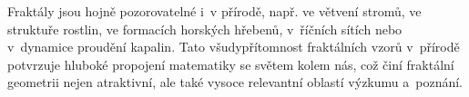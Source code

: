 Fraktály jsou hojně pozorovatelné i~v přírodě, např. ve větvení stromů, ve struktuře rostlin, ve formacích horských hřebenů, v~říčních sítích nebo v~dynamice proudění kapalin. Tato všudypřítomnost fraktálních vzorů v~přírodě potvrzuje hluboké propojení matematiky se světem kolem nás, což činí fraktální geometrii nejen atraktivní, ale také vysoce relevantní oblastí výzkumu a~poznání.